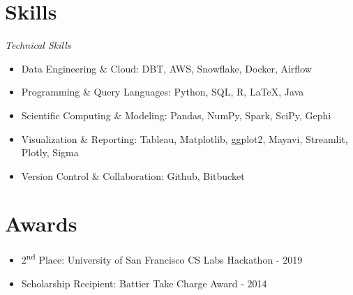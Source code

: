 \documentclass[11pt,a4paper]{article}
\newenvironment{myitemize}
{ \begin{itemize}[label={--}, leftmargin=*]
		\setlength{\itemsep}{0pt}
		\setlength{\parskip}{0pt}
		\setlength{\parsep}{0pt}     }
	{ \end{itemize}                  }
\begin{document}
	\section*{Skills}
	\vspace{-1.5mm} %
\textit{Technical Skills}
\vspace{-2.5mm} %
	\begin{myitemize}
		\item Data Engineering \& Cloud: DBT, AWS, Snowflake, Docker, Airflow
		\item Programming \& Query Languages: Python, SQL, R, LaTeX, Java
		\item Scientific Computing \& Modeling: Pandas, NumPy, Spark, SciPy, Gephi
		\item Visualization \& Reporting: Tableau, Matplotlib, ggplot2, Mayavi, Streamlit, Plotly, Sigma
		\item Version Control \& Collaboration: Github, Bitbucket

		
	\end{myitemize}
	
	\section*{Awards}
	\vspace{-2.5mm} %
	\begin{myitemize}
		\item 2\textsuperscript{nd} Place: University of San Francisco CS Labs Hackathon - 2019
		\item Scholarship Recipient: Battier Take Charge Award - 2014

		
	\end{myitemize}
	

	
	
	
\end{document}
